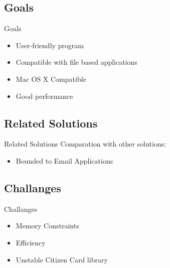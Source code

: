 \subsection{Goals}
\begin{frame}{Goals}
\begin{itemize}
\item User-friendly program
\item Compatible with file based applications
\item Mac OS X Compatible
\item Good performance
\end{itemize}
\end{frame}

\subsection{Related Solutions}
\begin{frame}{Related Solutions}
Comparation with other solutions:\\
\begin{itemize}
  \item Bounded to Email Applications
\end{itemize}
\end{frame}



\subsection{Challanges}
\begin{frame}{Challanges}
\begin{itemize}
  \item Memory Constraints
  \item Efficiency
  \item Unstable Citizen Card library 
\end{itemize}
\end{frame}





